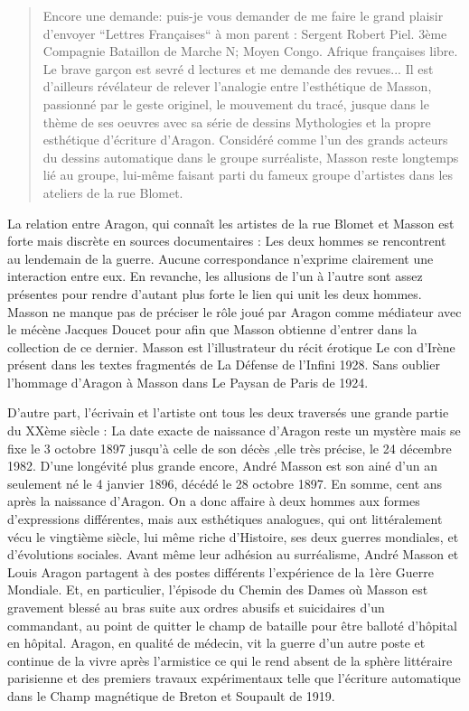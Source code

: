 \begin{quote}
Encore une demande: puis-je vous demander de me faire le grand plaisir d’envoyer “Lettres Françaises“ à mon parent : Sergent Robert Piel. 3ème Compagnie Bataillon de Marche N; Moyen Congo. Afrique françaises libre.  Le brave garçon est sevré d lectures et me demande des revues...
  Il est d’ailleurs révélateur de relever l’analogie entre l’esthétique de Masson, passionné par le geste originel, le mouvement du tracé, jusque dans le thème de ses oeuvres avec sa série de dessins Mythologies et la propre esthétique d’écriture d’Aragon. Considéré comme l’un des grands acteurs du dessins automatique dans le groupe surréaliste, Masson reste longtemps lié au groupe, lui-même faisant parti du fameux groupe d’artistes dans les ateliers de la rue Blomet.
  \end{quote} 
	La relation entre Aragon, qui connaît les artistes de la rue Blomet et Masson est forte mais discrète en sources documentaires : Les deux hommes se rencontrent au lendemain de la guerre. Aucune correspondance n’exprime clairement une interaction entre eux. En revanche, les allusions de l’un à l’autre sont assez présentes pour rendre d’autant plus forte le lien qui unit les deux hommes. Masson ne manque pas de préciser le rôle joué par Aragon comme médiateur avec le mécène Jacques Doucet pour afin que Masson obtienne d’entrer dans la collection de ce dernier. Masson est l’illustrateur du récit érotique  Le con d’Irène présent dans les textes fragmentés de La Défense de l’Infini 1928. Sans oublier l’hommage d’Aragon à Masson dans Le Paysan de Paris de 1924. 

	D’autre part, l’écrivain et l’artiste ont tous les deux traversés une grande partie du XXème siècle : La date  exacte de naissance d’Aragon reste un mystère mais se fixe le 3 octobre 1897 jusqu’à celle de son décès ,elle très précise, le 24 décembre 1982. D’une longévité plus grande encore, André Masson est son ainé d’un an seulement né le 4 janvier 1896, décédé le 28 octobre 1897. En somme, cent ans après la naissance d’Aragon. On a donc affaire à deux hommes aux formes d’expressions différentes, mais aux esthétiques analogues, qui ont littéralement vécu le vingtième siècle, lui même riche d’Histoire, ses deux guerres mondiales, et d’évolutions sociales. Avant même leur adhésion au surréalisme, André Masson et Louis Aragon partagent à des postes différents l’expérience de la 1ère Guerre Mondiale. Et, en particulier, l’épisode du Chemin des Dames où Masson est gravement blessé au bras suite aux ordres abusifs et suicidaires d’un commandant, au point de quitter le champ de bataille pour être balloté d’hôpital en hôpital. Aragon, en qualité de médecin, vit la guerre d’un autre poste et continue de la vivre après l’armistice ce qui le rend absent de la sphère littéraire parisienne et des premiers travaux expérimentaux telle que l’écriture automatique dans le Champ magnétique de Breton et Soupault de 1919.

